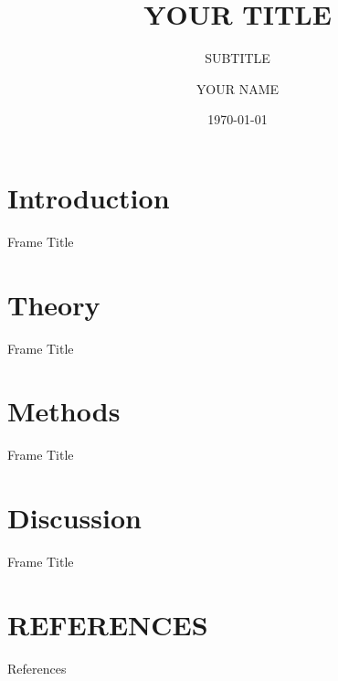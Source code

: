 \documentclass[15pt, xcolor=table]{beamer}
\title{YOUR TITLE}
\subtitle{SUBTITLE}
\author[shortname]{YOUR NAME}
\institute[shortinst]{INSTITUTION}
\date{\today}
\begin{document}
\maketitle

\section{Introduction}
\begin{frame}{Frame Title}
    
\end{frame}

\section{Theory}
\begin{frame}{Frame Title}
    
\end{frame}

\section{Methods}
\begin{frame}{Frame Title}
    
\end{frame}

\section{Discussion}
\begin{frame}{Frame Title}
    
\end{frame}

\section*{REFERENCES}
\begin{frame}[allowframebreaks]{References}
    \tiny
\end{frame}

\appendix
\end{document}
